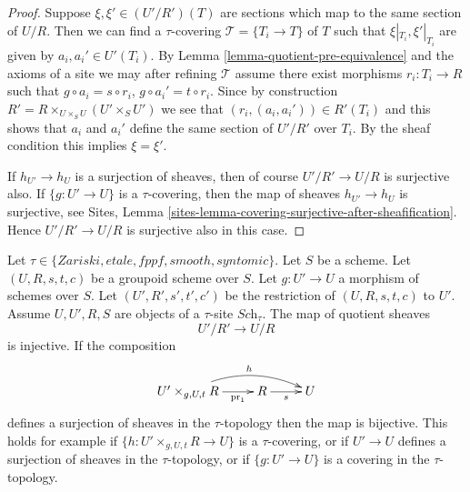 \begin{proof}
Suppose $\xi, \xi' \in (U'/R')(T)$ are sections which
map to the same section of $U/R$.
Then we can find a $\tau$-covering $\mathcal{T} = \{T_i \to T\}$ of $T$
such that $\xi|_{T_i}, \xi'|_{T_i}$ are given by $a_i, a_i' \in U'(T_i)$. By
Lemma \ref{lemma-quotient-pre-equivalence}
and the axioms of a site we may after refining
$\mathcal{T}$ assume there exist morphisms $r_i : T_i \to R$
such that $g \circ a_i = s \circ r_i$, $g \circ a_i' = t \circ r_i$.
Since by construction
$R' = R \times_{U \times_S U} (U' \times_S U')$
we see that $(r_i, (a_i, a_i')) \in R'(T_i)$ and this
shows that $a_i$ and $a_i'$ define the same section
of $U'/R'$ over $T_i$. By the sheaf condition this implies
$\xi = \xi'$.

\medskip\noindent
If $h_{U'} \to h_U$ is a surjection
of sheaves, then of course $U'/R' \to U/R$ is surjective also.
If $\{g : U' \to U\}$ is a $\tau$-covering, then
the map of sheaves $h_{U'} \to h_U$ is surjective, see
Sites, Lemma \ref{sites-lemma-covering-surjective-after-sheafification}.
Hence $U'/R' \to U/R$ is surjective also in this case.
\end{proof}

\begin{lemma}
\label{lemma-quotient-groupoid-restrict}
Let $\tau \in \{Zariski, etale, fppf, smooth, syntomic\}$.
Let $S$ be a scheme.
Let $(U, R, s, t, c)$ be a groupoid scheme over $S$.
Let $g : U' \to U$ a morphism of schemes over $S$.
Let $(U', R', s', t', c')$ be the restriction of $(U, R, s, t, c)$ to $U'$. 
Assume  $U, U', R, S$ are objects of a $\tau$-site $\textit{Sch}_\tau$.
The map of quotient sheaves
$$
U'/R' \longrightarrow U/R
$$
is injective. If the composition
$$
\xymatrix{
U' \times_{g, U, t} R \ar[r]_-{\text{pr}_1} \ar@/^3ex/[rr]^h
& R \ar[r]_s & U
}
$$
defines a surjection of sheaves in the $\tau$-topology  then
the map is bijective. This holds for example if
$\{h : U' \times_{g, U, t} R \to U\}$ is a $\tau$-covering, or
if $U' \to U$ defines a surjection of sheaves in the $\tau$-topology, or if
$\{g : U' \to U\}$ is a covering in the $\tau$-topology.
\end{lemma}

